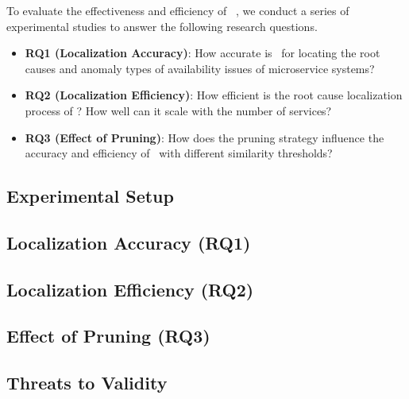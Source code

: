 To evaluate the effectiveness and efficiency of \app~, we conduct a series of experimental studies to answer the following research questions.

\begin{itemize}
    \item \textbf{RQ1 (Localization Accuracy)}: How accurate is \app~for locating the root causes and anomaly types of availability issues of microservice systems?
    
    \item \textbf{RQ2 (Localization Efficiency)}: How efficient is the root cause localization process of \app? How well can it scale with the number of services?

    \item \textbf{RQ3 (Effect of Pruning)}: How does the pruning strategy influence the accuracy and efficiency of \app~with different similarity thresholds?
\end{itemize}

\subsection{Experimental Setup}


\subsection{Localization Accuracy (RQ1)}


\subsection{Localization Efficiency (RQ2)}


\subsection{Effect of Pruning (RQ3)}


\subsection{Threats to Validity}


